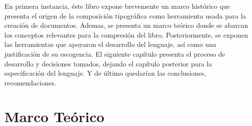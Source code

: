 \documentclass[12pt,letterpaper,titlepage,oneside,openright]{book}
\begin{document}
En primera instancia, éste libro expone brevemente un marco histórico que presenta el origen de la composición tipográfica como herramienta usada para la creación de documentos. Ademas, se presenta un marco teórico donde se abarcan los conceptos relevantes para la compresión del libro. Posteriormente, se exponen las herramientas que apoyaron el desarrollo del lenguaje, así como una justificación de su escogencia. El siguiente capítulo presenta el proceso de desarrollo y decisiones tomados, dejando el capítulo posterior para la especificación del lenguaje. Y de último quedarían las conclusiones, recomendaciones.%


\chapter{Marco Teórico}
\end{document}
